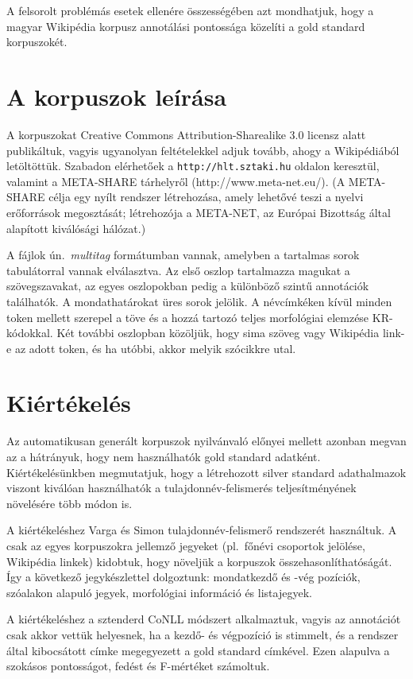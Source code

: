 \documentclass{llncs}
\begin{document}
A felsorolt problémás esetek ellenére összességében azt mondhatjuk, hogy a magyar Wikipédia korpusz annotálási pontossága közelíti a gold standard korpuszokét. %

\section{A korpuszok leírása}
\label{desc}

A korpuszokat Creative Commons Attribution-Sharealike 3.0 licensz alatt publikáltuk, vagyis ugyanolyan feltételekkel adjuk tovább, ahogy a Wikipédiából letöltöttük. Szabadon elérhetőek a \texttt{http://hlt.sztaki.hu} oldalon keresztül, valamint a META-SHARE tárhelyről (http://www.meta-net.eu/). (A META-SHARE célja egy nyílt rendszer létrehozása, amely lehetővé teszi a nyelvi erőforrások megosztását; létrehozója a META-NET, az Európai Bizottság által alapított kiválósági hálózat.) 

A fájlok ún.~\emph{multitag} formátumban vannak, amelyben a tartalmas sorok tabulátorral vannak elválasztva. Az első oszlop tartalmazza magukat a szövegszavakat, az egyes oszlopokban pedig a különböző szintű annotációk találhatók. A mondathatárokat üres sorok jelölik. A névcímkéken kívül minden token mellett szerepel a töve és a hozzá tartozó teljes morfológiai elemzése KR-kódokkal. Két további oszlopban közöljük, hogy sima szöveg vagy Wikipédia link-e az adott token, és ha utóbbi, akkor melyik szócikkre utal. 

\section{Kiértékelés}
\label{results}

Az automatikusan generált korpuszok nyilvánvaló előnyei mellett azonban megvan az a hátrányuk, hogy nem használhatók gold standard adatként. Kiértékelésünkben megmutatjuk, hogy a létrehozott silver standard adathalmazok viszont kiválóan használhatók a tulajdonnév-felismerés teljesítményének növelésére több módon is. 

A kiértékeléshez Varga és Simon \cite{Varga} tulajdonnév-felismerő rendszerét használtuk. A csak az egyes korpuszokra jellemző jegyeket (pl.~főnévi csoportok jelölése, Wikipédia linkek) kidobtuk, hogy növeljük a korpuszok összehasonlíthatóságát. Így a következő jegykészlettel dolgoztunk: mondatkezdő és -vég pozíciók, szóalakon alapuló jegyek, morfológiai információ és listajegyek. 

A kiértékeléshez a sztenderd CoNLL módszert alkalmaztuk, vagyis az annotációt csak akkor vettük helyesnek, ha a kezdő- és végpozíció is stimmelt, és a rendszer által kibocsátott címke megegyezett a gold standard címkével. Ezen alapulva a szokásos pontosságot, fedést és F-mértéket számoltuk. 
\end{document}
